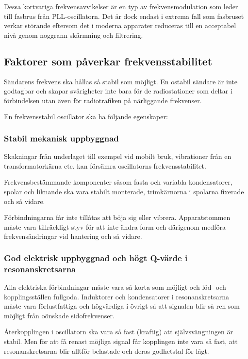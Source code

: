 Dessa kortvariga frekvensavvikelser är en typ av frekvensmodulation
som leder till fasbrus från PLL-oscillatorn.
Det är dock endast i extrema fall som fasbruset verkar störande eftersom det
i moderna apparater reduceras till en acceptabel nivå genom noggrann
skärmning och filtrering.

\subsection{Faktorer som påverkar frekvensstabilitet}

Sändarens frekvens ska hållas så stabil som möjligt.
En ostabil sändare är inte godtagbar och skapar svårigheter inte bara för de
radiostationer som deltar i förbindelsen utan även för radiotrafiken
på närliggande frekvenser.

En frekvensstabil oscillator ska ha följande egenskaper:

\subsubsection{Stabil mekanisk uppbyggnad}

Skakningar från underlaget till exempel vid mobilt bruk, vibrationer från en
transformatorkärna etc. kan försämra oscillatorns frekvensstabilitet.

Frekvensbestämmande komponenter såsom fasta och variabla kondensatorer, spolar
och liknande ska vara stabilt monterade, trimkärnorna i spolarna fixerade och
så vidare.

Förbindningarna får inte tillåtas att böja sig eller vibrera.
Apparatstommen måste vara tillräckligt styv för att inte ändra form och
därigenom medföra frekvensändringar vid hantering och så vidare.

\subsubsection{God elektrisk uppbyggnad och högt Q-värde i resonanskretsarna}

Alla elektriska förbindningar måste vara så korta som möjligt och löd- och
kopplingsställen fullgoda.
Induktorer och kondensatorer i resonanskretsarna måste vara förlustfattiga
och högvärdiga i övrigt så att signalen blir så ren som möjligt från oönskade
sidofrekvenser.

Återkopplingen i oscillatorn ska vara så fast (kraftig) att självsvängningen
är stabil.
Men för att få renast möjliga signal får kopplingen inte vara så fast,
att resonanskretsarna blir alltför belastade och deras godhetstal för lågt.

